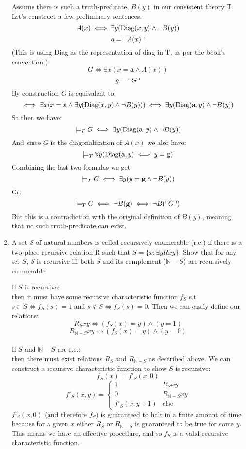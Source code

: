 \begin{enumerate}
    Assume there is such a truth-predicate, $B(y)$ in our consistent theory T. Let's construct a few preliminary sentences:
    $$A(x) \iff \exists y (\text{Diag}(x,y) \land \neg B(y))$$
    $$a = \ulcorner A(x) \urcorner$$
    (This is using Diag as the representation of diag in T, as per the book's convention.)
    $$G \iff \exists x (x = \textbf{a} \land A(x))$$
    $$g = \ulcorner G \urcorner$$
    By construction $G$ is equivalent to:
    $$\iff \exists x (x = \textbf{a} \land \exists y (\text{Diag}(x,y) \land \neg B(y))) \iff \exists y (\text{Diag}(\textbf{a},y) \land \neg B(y))$$
    So then we have:
    $$\mathrel{|}\!=_T G \iff \exists y (\text{Diag}(\textbf{a},y) \land \neg B(y))$$
    And since $G$ is the diagonalization of $A(x)$ we also have:
    $$\mathrel{|}\!=_T \forall y (\text{Diag}(\textbf{a},y) \iff y = \textbf{g})$$
    Combining the last two formulas we get:
    $$\mathrel{|}\!=_T G \iff \exists y (y = \textbf{g} \land \neg B(y))$$
    Or:
    $$\mathrel{|}\!=_T G \iff \neg B(\textbf{g}) \iff \neg B(\ulcorner G \urcorner)$$
    But this is a contradiction with the original definition of $B(y)$, meaning that no such truth-predicate can exist.

  \item
    \begin{question}
      A set $S$ of natural numbers is called recursively enumerable (r.e.) if there is a two-place recursive relation R such that $S = \{ x : \exists y R x y \}$. Show that for any set $S$, $S$ is recursive iff both $S$ and its complement ($\mathds{N}-S$) are recursively enumerable.
    \end{question}

    If $S$ is recursive:\\
    then it must have some recursive characteristic function $f_S$ s.t. $s \in S \iff f_S(s) = 1$ and $s \not \in S \iff f_S(s) = 0$. Then we can easily define our relations:
    $$R_S x y \iff (f_S(x)=y) \land (y=1)$$
    $$R_{\mathds{N}-S} x y \iff (f_S(x)=y) \land (y=0)$$\\

    If $S$ and $\mathds{N} - S$ are r.e.:\\
    then there must exist relations $R_S$ and $R_{\mathds{N}-S}$ as described above. We can construct a recursive characteristic function to show $S$ is recursive:
    $$f_S(x) = f'_S(x,0)$$
    $$f'_S(x,y) =
    \begin{cases}
      1 & R_S x y \\
      0 & R_{\mathds{N}-S} x y\\
      f'_S(x,y+1) & \text{else}
    \end{cases}
    $$
    $f'_S(x,0)$ (and therefore $f_S$) is guaranteed to halt in a finite amount of time because for a given $x$ either $R_S$ or $R_{\mathds{N}-S}$ is guaranteed to be true for some $y$. This means we have an effective procedure, and so $f_S$ is a valid recursive characteristic function.





\end{enumerate}
